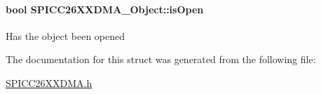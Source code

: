 \paragraph[{is\+Open}]{\setlength{\rightskip}{0pt plus 5cm}bool S\+P\+I\+C\+C26\+X\+X\+D\+M\+A\+\_\+\+Object\+::is\+Open}\label{struct_s_p_i_c_c26_x_x_d_m_a___object_a54ded097b995c036bd7e12fc2e00139f}
Has the object been opened 

The documentation for this struct was generated from the following file\+:\begin{DoxyCompactItemize}
\item 
\hyperlink{_s_p_i_c_c26_x_x_d_m_a_8h}{S\+P\+I\+C\+C26\+X\+X\+D\+M\+A.\+h}\end{DoxyCompactItemize}
